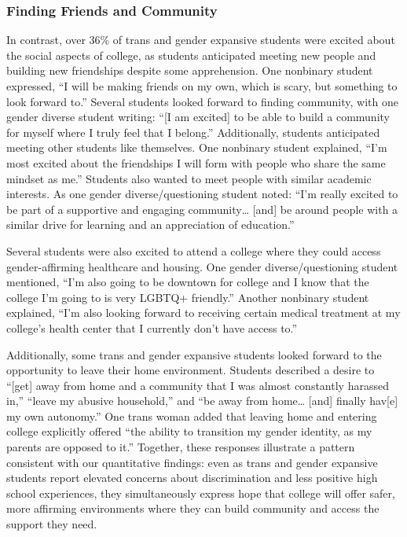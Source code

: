 \subsubsection{Finding Friends and Community}\label{finding-friends-and-community}

In contrast, over 36\% of trans and gender expansive students were
excited about the social aspects of college, as students anticipated
meeting new people and building new friendships despite some
apprehension. One nonbinary student expressed, ``I will be making friends
on my own, which is scary, but something to look forward to.'' Several
students looked forward to finding community, with one gender diverse
student writing: ``{[}I am excited{]} to be able to build a community for
myself where I truly feel that I belong.'' Additionally, students
anticipated meeting other students like themselves. One nonbinary
student explained, ``I'm most excited about the friendships I will form
with people who share the same mindset as me.'' Students also wanted to
meet people with similar academic interests. As one gender
diverse/questioning student noted: ``I'm really excited to be part of a
supportive and engaging community\ldots{} {[}and{]} be around people with a
similar drive for learning and an appreciation of education.''

Several students were also excited to attend a college where they could
access gender-affirming healthcare and housing. One gender
diverse/questioning student mentioned, ``I'm also going to be downtown
for college and I know that the college I'm going to is very LGBTQ+
friendly.'' Another nonbinary student explained, ``I'm also looking
forward to receiving certain medical treatment at my college's health
center that I currently don't have access to.''

Additionally, some trans and gender expansive students looked forward to
the opportunity to leave their home environment. Students described a
desire to ``{[}get{]} away from home and a community that I was almost
constantly harassed in,'' ``leave my abusive household,'' and ``be away from
home\ldots{} {[}and{]} finally hav{[}e{]} my own autonomy.'' One trans woman added
that leaving home and entering college explicitly offered ``the ability
to transition my gender identity, as my parents are opposed to it.''
Together, these responses illustrate a pattern consistent with our
quantitative findings: even as trans and gender expansive students
report elevated concerns about discrimination and less positive high
school experiences, they simultaneously express hope that college will
offer safer, more affirming environments where they can build community
and access the support they need.

